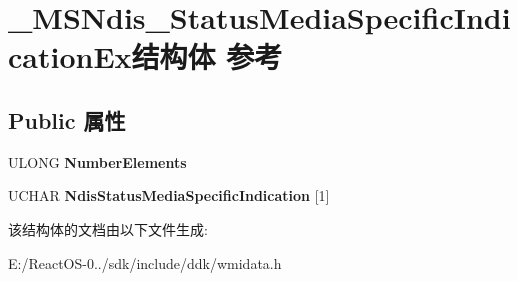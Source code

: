 \hypertarget{struct___m_s_ndis___status_media_specific_indication_ex}{}\section{\+\_\+\+M\+S\+Ndis\+\_\+\+Status\+Media\+Specific\+Indication\+Ex结构体 参考}
\label{struct___m_s_ndis___status_media_specific_indication_ex}
\subsection*{Public 属性}
\begin{DoxyCompactItemize}
\item 
\mbox{\label{struct___m_s_ndis___status_media_specific_indication_ex_a0fee0e4f160867ddd87bcf32519a8af9}} 
U\+L\+O\+NG {\bfseries Number\+Elements}
\item 
\mbox{\label{struct___m_s_ndis___status_media_specific_indication_ex_ab819f3300897f1dd186f8bb39b0b5260}} 
U\+C\+H\+AR {\bfseries Ndis\+Status\+Media\+Specific\+Indication} \mbox{[}1\mbox{]}
\end{DoxyCompactItemize}


该结构体的文档由以下文件生成\+:\begin{DoxyCompactItemize}
\item 
E\+:/\+React\+O\+S-\/0../sdk/include/ddk/wmidata.\+h\end{DoxyCompactItemize}
